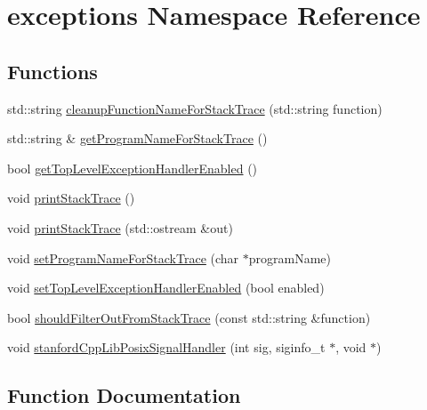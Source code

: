 \hypertarget{namespaceexceptions}{}\section{exceptions Namespace Reference}
\label{namespaceexceptions}
\subsection*{Functions}
\begin{DoxyCompactItemize}
\item 
std\+::string \mbox{\hyperlink{namespaceexceptions_a5461ca18351950c6bfd41a5848e5cc21}{cleanup\+Function\+Name\+For\+Stack\+Trace}} (std\+::string function)
\item 
std\+::string \& \mbox{\hyperlink{namespaceexceptions_ad0ad190a25caba8c9ce8b2083205cd63}{get\+Program\+Name\+For\+Stack\+Trace}} ()
\item 
bool \mbox{\hyperlink{namespaceexceptions_a6a3658a12893a1ea2acaa6fc6e8b6d82}{get\+Top\+Level\+Exception\+Handler\+Enabled}} ()
\item 
void \mbox{\hyperlink{namespaceexceptions_aead48c8fee26adf26f493d0856d73830}{print\+Stack\+Trace}} ()
\item 
void \mbox{\hyperlink{namespaceexceptions_af5ab86e2f23863043ddcdaf18b8b9f28}{print\+Stack\+Trace}} (std\+::ostream \&out)
\item 
void \mbox{\hyperlink{namespaceexceptions_ad0e98551ca679408334da24bdf4e4584}{set\+Program\+Name\+For\+Stack\+Trace}} (char $\ast$program\+Name)
\item 
void \mbox{\hyperlink{namespaceexceptions_aecffab3c2119276b44cb55564b11e520}{set\+Top\+Level\+Exception\+Handler\+Enabled}} (bool enabled)
\item 
bool \mbox{\hyperlink{namespaceexceptions_ac20de63bd41bb6c1f95bd2af4c3eaf53}{should\+Filter\+Out\+From\+Stack\+Trace}} (const std\+::string \&function)
\item 
void \mbox{\hyperlink{namespaceexceptions_af5fc12dcfd6bf28b568340210c9cc291}{stanford\+Cpp\+Lib\+Posix\+Signal\+Handler}} (int sig, siginfo\+\_\+t $\ast$, void $\ast$)
\end{DoxyCompactItemize}


\subsection{Function Documentation}
\mbox{\label{namespaceexceptions_a5461ca18351950c6bfd41a5848e5cc21}} 
